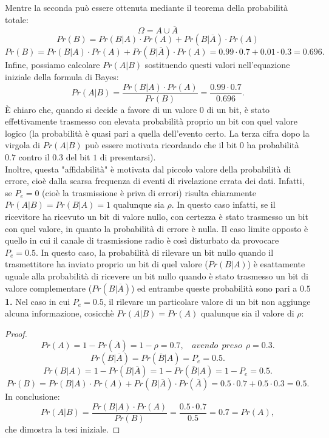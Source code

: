 \documentclass[12pt,oneside,openany]{memoir}
\numberwithin{equation}{subsection}
\begin{document}
Mentre la seconda pu\`o essere ottenuta mediante il teorema della probabilit\`a
totale:
\[
    \Omega = A \cup \overline{A}
\]
\[
    Pr(B) = Pr(B | A) \cdot Pr(A) + Pr(B | \overline{A}) \cdot Pr(A)
\]
\[
    Pr(B) = Pr(B | A) \cdot Pr(A) + Pr(B | \overline{A}) \cdot Pr(A) = 0.99
    \cdot 0.7 + 0.01 \cdot 0.3 = 0.696.
\]
Infine, possiamo calcolare $Pr(A | B)$ sostituendo questi valori nell'equazione
iniziale della formula di Bayes:
\[
    Pr(A | B) = \frac{Pr(B | A) \cdot Pr(A)}{Pr(B)} =
    \frac{0.99 \cdot 0.7}{0.696}.
\]
\`E chiaro che, quando si decide a favore di un valore $0$ di un bit, \`e stato
effettivamente trasmesso con elevata probabilit\`a proprio un bit con quel
valore logico (la probabilit\`a \`e quasi pari a quella dell'evento certo. La
terza cifra dopo la virgola di $Pr(A | B)$ pu\`o essere motivata ricordando che
il bit $0$ ha probabilit\`a $0.7$ contro il $0.3$ del bit $1$ di presentarsi).\\
Inoltre, questa "affidabilit\`a" \`e motivata dal piccolo valore della
probabilit\`a di errore, cio\`e dalla scarsa frequenza di eventi di rivelazione
errata dei dati. Infatti, se $P_e = 0$ (cio\`e la trasmissione \`e priva di
errori) risulta chiaramente $Pr(A | B) = Pr(B | A) = 1$ qualunque sia $\rho$. In
questo caso infatti, se il ricevitore ha ricevuto un bit di valore nullo, con
certezza \`e stato trasmesso un bit con quel valore, in quanto la probabilit\`a
di errore \`e nulla. Il caso limite opposto \`e quello in cui il canale di
trasmissione radio \`e cos\`i disturbato da provocare $P_e = 0.5$. In questo
caso, la probabilit\`a di rilevare un bit nullo quando il trasmettitore ha
inviato proprio un bit di quel valore ($Pr(B | A)$) \`e esattamente uguale alla
probabilit\`a di ricevere un bit nullo quando \`e stato trasmesso un bit di
valore complementare ($Pr(B | \overline{A})$) ed entrambe queste probabilit\`a
sono pari a $0.5$
\bigbreak\noindent
\textbf{1.} Nel caso in cui $P_e = 0.5$, il rilevare un particolare valore di un
bit non aggiunge alcuna informazione, cosicch\`e $Pr(A | B) = Pr(A)$ qualunque
sia il valore di $\rho$:
\begin{proof}
\[
    Pr(A) = 1 - Pr(\overline{A}) = 1 - \rho = 0.7, \ \ \ \ avendo \ \ preso \ \ 
    \rho = 0.3.
\]
\[
    Pr(B | \overline{A}) = Pr(\overline{B} | A) = P_e = 0.5.
\]
\[
    Pr(B | A) = 1 - Pr(B | \overline{A}) = 1 - Pr(\overline{B} | A) = 1 - P_e =
    0.5.
\]
\[
    Pr(B) = Pr(B|A) \cdot Pr(A) + Pr(B | \overline{A}) \cdot Pr(\overline{A}) =
    0.5 \cdot 0.7 + 0.5 \cdot 0.3 = 0.5.
\]
In conclusione:
\[
    Pr(A | B) = \frac{Pr(B | A) \cdot Pr(A)}{Pr(B)} = \frac{0.5 \cdot 0.7}{0.5}
    = 0.7 = Pr(A),
\]
che dimostra la tesi iniziale.
\end{proof}
\end{document}
